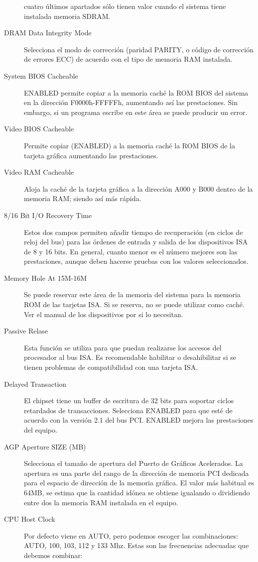 \documentclass[12pt,oneside,a4paper]{article}
\begin{document}
\begin{description}
					cuatro últimos apartados sólo tienen valor cuando el
					sistema tiene instalada memoria SDRAM.
				\item[DRAM Data Integrity Mode] Selecciona el modo de
					corrección (paridad PARITY, o código de corrección de
					errores ECC) de acuerdo con el tipo de memoria RAM
					instalada.
				\item[System BIOS Cacheable] ENABLED permite copiar a la
					memoria caché la ROM BIOS del sistema en la dirección
					F0000h-FFFFFh, aumentando así las prestaciones. Sin
					embargo, si un programa escribe en este área se puede
					producir un error.
				\item[Video BIOS Cacheable] Permite copiar (ENABLED) a la
					memoria caché la ROM BIOS de la tarjeta gráfica aumentando
					las prestaciones.
				\item[Video RAM Cacheable] Aloja la caché de la tarjeta gráfica
					a la dirección A000 y B000 dentro de la memoria RAM; siendo
					así más rápida.
				\item[8/16 Bit I/O Recovery Time] Estos dos campos permiten
					añadir tiempo de recuperación (en ciclos de reloj del bus)
					para las órdenes de entrada y salida de los dispositivos
					ISA de 8 y 16 bits. En general, cuanto menor es el número
					mejores son las prestaciones, aunque deben hacerse pruebas
					con los valores seleccionados.
				\item[Memory Hole At 15M-16M] Se puede reservar este área de la
					memoria del sistema para la memoria ROM de las tarjetas
					ISA. Si se reserva, no se puede utilizar como caché. Ver el
					manual de los dispositivos por si lo necesitan.
				\item[Passive Relase] Esta función se utiliza para que puedan
					realizarse los accesos del procesador al bus ISA. Es
					recomendable habilitar o desahibilitar si se tienen
					problemas de compatibilidad con una tarjeta ISA.
				\item[Delayed Transaction] El chipset tiene un buffer de
					escritura de 32 bits para soportar ciclos retardados de
					transacciones. Selecciona ENABLED para que esté de acuerdo
					con la versión 2.1 del bus PCI. ENABLED mejora las
					prestaciones del equipo.
				\item[AGP Aperture SIZE (MB)] Selecciona el tamaño de apertura
					del Puerto de Gráficos Acelerados.  La apertura es una
					parte del rango de la dirección de memoria PCI dedicada
					para el espacio de dirección de la memoria gráfica.  El
					valor más habitual es 64MB, se estima que la cantidad
					idónea se obtiene igualando o dividiendo entre dos la
					memoria RAM instalada en el equipo.
				\item[CPU Host Clock] Por defecto viene en AUTO, pero podemos
					escoger las combinaciones: AUTO, 100, 103, 112 y 133 Mhz.
				    Estas son las frecuencias adecuadas que debemos combinar: \\ 


\end{description}
\end{document}
